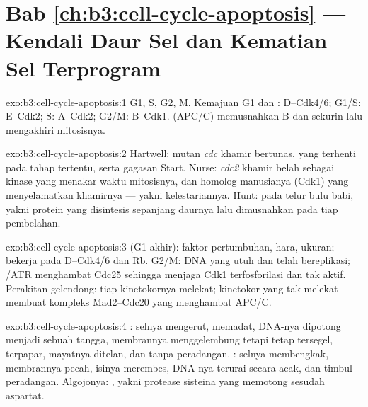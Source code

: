 \section*{Bab \ref{ch:b3:cell-cycle-apoptosis} --- Kendali Daur Sel dan Kematian Sel Terprogram}

\begin{solution}{exo:b3:cell-cycle-apoptosis:1}
G1, S, G2, M. Kemajuan G1 dan :  D--Cdk4/6;
G1/S:  E--Cdk2; S:  A--Cdk2; G2/M:  B--Cdk1.
 (APC/C) memusnahkan  B dan sekurin lalu
mengakhiri mitosisnya.
\end{solution}

\begin{solution}{exo:b3:cell-cycle-apoptosis:2}
Hartwell: mutan \emph{cdc} khamir bertunas, yang terhenti pada tahap
tertentu, serta gagasan Start. Nurse: \emph{cdc2} khamir belah
sebagai kinase yang menakar waktu mitosisnya, dan homolog manusianya (Cdk1)
yang menyelamatkan khamirnya --- yakni kelestariannya. Hunt:  pada telur
bulu babi, yakni protein yang disintesis sepanjang daurnya lalu dimusnahkan
pada tiap pembelahan.
\end{solution}

\begin{solution}{exo:b3:cell-cycle-apoptosis:3}
 (G1 akhir): faktor pertumbuhan, hara, ukuran; bekerja pada
 D--Cdk4/6 dan Rb. G2/M: DNA yang utuh dan telah bereplikasi; /ATR
menghambat Cdc25 sehingga menjaga Cdk1 terfosforilasi dan tak aktif. Perakitan
gelendong: tiap kinetokornya melekat; kinetokor yang tak melekat membuat
kompleks Mad2--Cdc20 yang menghambat APC/C.
\end{solution}

\begin{solution}{exo:b3:cell-cycle-apoptosis:4}
: selnya mengerut,  memadat, DNA-nya dipotong menjadi
sebuah tangga, membrannya menggelembung tetapi tetap tersegel,
 terpapar, mayatnya ditelan, dan tanpa peradangan.
: selnya membengkak, membrannya pecah, isinya merembes, DNA-nya
terurai secara acak, dan timbul peradangan. Algojonya: , yakni protease sisteina yang
memotong sesudah aspartat.
\end{solution}

